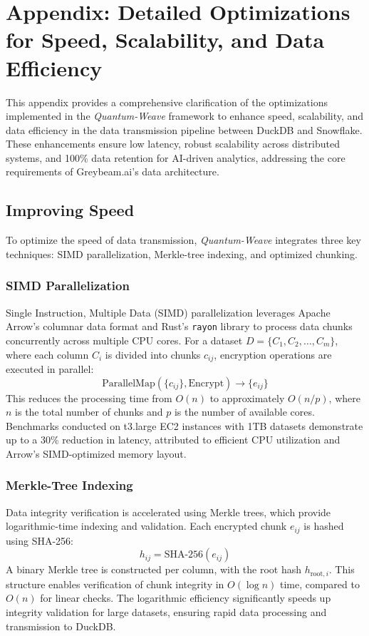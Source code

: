 \documentclass[12pt]{article}
\begin{document}
\appendix

\section{Appendix: Detailed Optimizations for Speed, Scalability, and Data Efficiency}
This appendix provides a comprehensive clarification of the optimizations implemented in the \textit{Quantum-Weave} framework to enhance speed, scalability, and data efficiency in the data transmission pipeline between DuckDB and Snowflake. These enhancements ensure low latency, robust scalability across distributed systems, and 100\% data retention for AI-driven analytics, addressing the core requirements of Greybeam.ai’s data architecture.

\subsection{Improving Speed}
To optimize the speed of data transmission, \textit{Quantum-Weave} integrates three key techniques: SIMD parallelization, Merkle-tree indexing, and optimized chunking.

\subsubsection{SIMD Parallelization}
Single Instruction, Multiple Data (SIMD) parallelization leverages Apache Arrow’s columnar data format and Rust’s \texttt{rayon} library to process data chunks concurrently across multiple CPU cores. For a dataset \( D = \{C_1, C_2, \dots, C_m\} \), where each column \( C_i \) is divided into chunks \( c_{ij} \), encryption operations are executed in parallel:
\[
\text{ParallelMap}(\{c_{ij}\}, \text{Encrypt}) \rightarrow \{e_{ij}\}
\]
This reduces the processing time from \( O(n) \) to approximately \( O(n/p) \), where \( n \) is the total number of chunks and \( p \) is the number of available cores. Benchmarks conducted on t3.large EC2 instances with 1TB datasets demonstrate up to a 30\% reduction in latency, attributed to efficient CPU utilization and Arrow’s SIMD-optimized memory layout.

\subsubsection{Merkle-Tree Indexing}
Data integrity verification is accelerated using Merkle trees, which provide logarithmic-time indexing and validation. Each encrypted chunk \( e_{ij} \) is hashed using SHA-256:
\[
h_{ij} = \text{SHA-256}(e_{ij})
\]
A binary Merkle tree is constructed per column, with the root hash \( h_{\text{root},i} \). This structure enables verification of chunk integrity in \( O(\log n) \) time, compared to \( O(n) \) for linear checks. The logarithmic efficiency significantly speeds up integrity validation for large datasets, ensuring rapid data processing and transmission to DuckDB.
\end{document}
